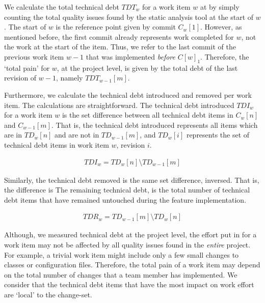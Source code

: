 \documentclass{mpaper}
\begin{document}
We calculate the total technical debt $TDT_{w}$ for a work item $w$ at by simply
counting the total quality issues found by the static analysis tool at the start
of $w$. The start of $w$ is the reference point given by commit $C_{w}[1]$.
However, as mentioned before, the first commit already represents work completed
for $w$, not the work at the start of the item. Thus, we refer to the last
commit of the previous work item $w-1$ that was implemented \emph{before}
$C[w]_{1}$. Therefore, the `total pain' for $w$, at the project level, is given
by the total debt of the last revision of $w-1$, namely $TDT_{w-1}[m]$.

Furthermore, we calculate the technical debt introduced and removed per work
item. The calculations are straightforward. The technical debt introduced
$TDI_{w}$ for a work item $w$ is the set difference between all technical debt
items in $C_{w}[n]$ and $C_{w-1}[m]$. That is, the technical debt introduced
represents all items which are in $TD_{w}[n]$ and are not in $TD_{w-1}[m]$, and
$TD_{w}[i]$ represents the set of technical debt items in work item $w$,
revision $i$.

\begin{equation}
  \label{eq-td-introduced}
  \begin{aligned}
    TDI_{w} = TD_{w}[n]  \setminus TD_{w-1}[m]
  \end{aligned}
\end{equation}

Similarly, the technical debt removed is the same set difference, inversed. That
is, the difference is  The remaining technical debt, is the total number of
technical debt items that have remained untouched during the feature
implementation.

\begin{equation}
	\label{eq-td-introduced}
	\begin{aligned}
		TDR_{w} = TD_{w-1}[m]  \setminus TD_{w}[n]
	\end{aligned}
\end{equation}

Although, we measured technical debt at the project level, the effort put in for
a work item may not be affected by all quality issues found in the \emph{entire}
project. For example, a trivial work item might include only a few small changes
to classes or configuration files. Therefore, the total pain of a work item may
depend on the total number of changes that a team member has implemented. We
consider that the technical debt items that have the most impact on work effort
are `local' to the change-set.
\end{document}
